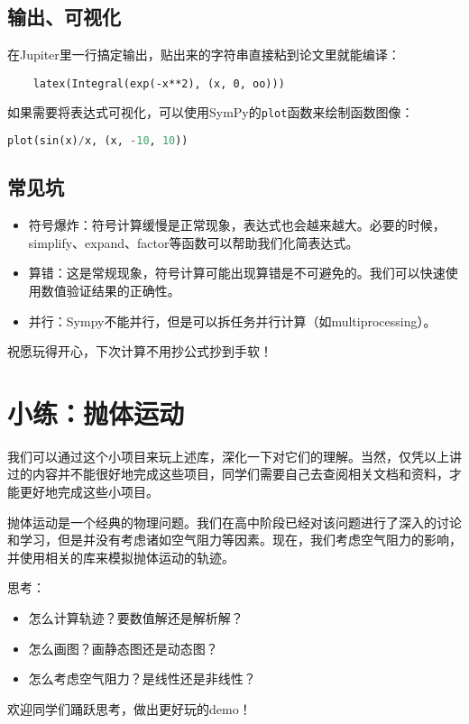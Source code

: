 \documentclass[../main.tex]{subfiles}
\begin{document}
\subsection{输出、可视化}
在Jupiter里一行搞定输出，贴出来的字符串直接粘到论文里就能编译：
\begin{lstlisting}
    latex(Integral(exp(-x**2), (x, 0, oo)))
\end{lstlisting}

如果需要将表达式可视化，可以使用SymPy的\texttt{plot}函数来绘制函数图像：
\begin{lstlisting}[language=python]
    plot(sin(x)/x, (x, -10, 10))
\end{lstlisting}

\subsection{常见坑}
\begin{itemize}
  \item 符号爆炸：符号计算缓慢是正常现象，表达式也会越来越大。必要的时候，simplify、expand、factor等函数可以帮助我们化简表达式。
  \item 算错：这是常规现象，符号计算可能出现算错是不可避免的。我们可以快速使用数值验证结果的正确性。
  \item 并行：Sympy不能并行，但是可以拆任务并行计算（如multiprocessing）。
\end{itemize}

祝愿玩得开心，下次计算不用抄公式抄到手软！

\section{小练：抛体运动}

我们可以通过这个小项目来玩上述库，深化一下对它们的理解。当然，仅凭以上讲过的内容并不能很好地完成这些项目，同学们需要自己去查阅相关文档和资料，才能更好地完成这些小项目。

抛体运动是一个经典的物理问题。我们在高中阶段已经对该问题进行了深入的讨论和学习，但是并没有考虑诸如空气阻力等因素。现在，我们考虑空气阻力的影响，并使用相关的库来模拟抛体运动的轨迹。

思考：
\begin{itemize}
  \item 怎么计算轨迹？要数值解还是解析解？
  \item 怎么画图？画静态图还是动态图？
  \item 怎么考虑空气阻力？是线性还是非线性？
\end{itemize}

欢迎同学们踊跃思考，做出更好玩的demo！
\end{document}
